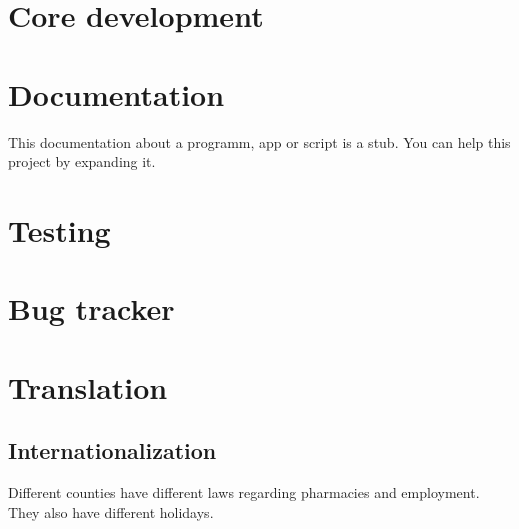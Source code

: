 \documentclass[12pt,a4paper,titlepage]{report}
\begin{document}
\section{Core development}
\section{Documentation}
This documentation about a programm, app or script is a stub. You can help this project by expanding it.

\section{Testing}
\section{Bug tracker}
\section{Translation}
\subsection{Internationalization}
Different counties have different laws regarding pharmacies and employment. They also have different holidays.
\end{document}
